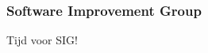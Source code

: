 \begin{frame}\frametitle{Software Improvement Group}
    \huge{\hfill Tijd voor SIG! \hfill}
\end{frame}
